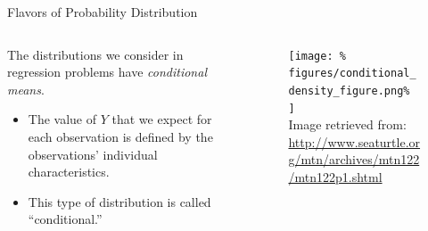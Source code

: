 \documentclass[10pt]{beamer}\usepackage[]{graphicx}\usepackage[]{color}
\begin{document}

\begin{frame}{Flavors of Probability Distribution}

  \begin{columns}
    \begin{column}{0.5\textwidth}
      The distributions we consider in regression problems have
      \emph{conditional means}.
      \vb
      \begin{itemize}
      \item The value of $Y$ that we expect for each observation is defined by
        the observations' individual characteristics.
        \vb
      \item This type of distribution is called ``conditional.''
      \end{itemize}
    \end{column}

    \begin{column}{0.5\textwidth}

      \begin{figure}
        \texttt{[image: \%
          figures/conditional\_density\_figure.png\%
        ]}\\
        \va
        \tiny{Image retrieved from:
            \url{http://www.seaturtle.org/mtn/archives/mtn122/mtn122p1.shtml}}
      \end{figure}

    \end{column}
  \end{columns}

\end{frame}

\end{document}
